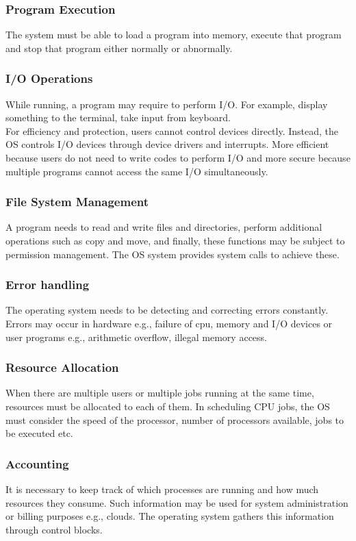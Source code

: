\documentclass[a4paper]{article}
\theoremstyle{plain}
\theoremstyle{definition}
\theoremstyle{remark}
\begin{document}
	\subsubsection{Program Execution}
	The system must be able to load a program into memory, execute that program and stop that program either normally or abnormally.
	\subsubsection{I/O Operations}
	While running, a program may require to perform I/O. For example, display something to the terminal, take input from keyboard. \\
	For efficiency and protection, users cannot control devices directly. Instead, the OS controls I/O devices through device drivers and interrupts. More efficient because users do not need to write codes to perform I/O and more secure because multiple programs cannot access the same I/O simultaneously. 
	\subsubsection{File System Management}
	A program needs to read and write files and directories, perform additional operations such as copy and move, and finally, these functions may be subject to permission management. The OS system provides system calls to achieve these.
	\subsubsection{Error handling}
	The operating system needs to be detecting and correcting errors constantly. Errors may occur in hardware e.g., failure of cpu, memory and I/O devices or user programs e.g., arithmetic overflow, illegal memory access. 
	\subsubsection{Resource Allocation}
	When there are multiple users or multiple jobs running at the same time, resources must be allocated to each of them. In scheduling CPU jobs, the OS must consider the speed of the processor, number of processors available, jobs to be executed etc.
	\subsubsection{Accounting}
	It is necessary to keep track of which processes are running and how much resources they consume. Such information may be used for system administration or billing purposes e.g., clouds. The operating system gathers this information through control blocks.
\end{document}
